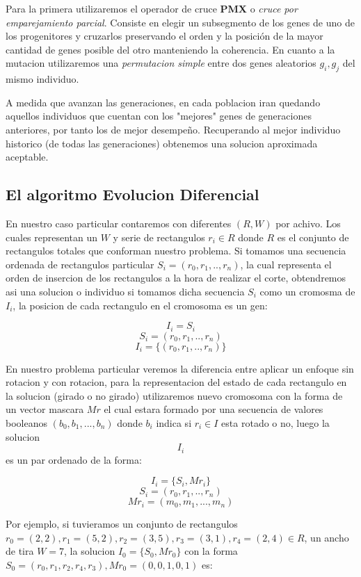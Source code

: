 \documentclass[10pt]{article}
\begin{document}
Para la primera utilizaremos el operador de cruce \textbf{PMX} o \textit{cruce por emparejamiento parcial}. Consiste en elegir un subsegmento de los genes de uno de los progenitores y cruzarlos preservando el orden y la posición de la mayor cantidad de genes posible del otro manteniendo la coherencia.
En cuanto a la mutacion utilizaremos una \textit{permutacion simple} entre dos genes aleatorios $g_i,g_j$ del mismo individuo.

A medida que avanzan las generaciones, en cada poblacion iran quedando aquellos individuos que cuentan con los "mejores"  genes de generaciones anteriores, por tanto los de mejor desempeño. Recuperando al mejor individuo historico (de todas las generaciones) obtenemos una solucion aproximada aceptable.

\subsection{El algoritmo Evolucion Diferencial}

En nuestro caso particular contaremos con diferentes $(R,W)$ por achivo. Los cuales representan un $W$ y serie de rectangulos $r_i \in R$ donde $R$ es el conjunto de rectangulos totales que conforman nuestro problema. Si tomamos una secuencia ordenada de rectangulos particular $S_i = (r_0,r_1,..,r_n)$, la cual representa el orden de insercion de los rectangulos a la hora de realizar el corte, obtendremos asi una solucion o individuo si tomamos dicha secuencia $S_i$ como un cromosma de $I_i$, la posicion de cada rectangulo en el cromosoma es un gen:

$$I_i = S_i$$
$$S_i = (r_0,r_1,..,r_n)$$
$$I_i = \{(r_0,r_1,..,r_n)\}$$

En nuestro problema particular veremos la diferencia entre aplicar un enfoque sin rotacion y con rotacion, para la representacion del estado de cada rectangulo en la solucion (girado o no girado) utilizaremos nuevo cromosoma con la forma de un vector mascara $Mr$ el cual estara formado por una secuencia de valores booleanos $(b_0, b_1,...,b_n)$ donde $b_i$ indica si $r_i \in I$ esta rotado o no, luego la solucion $$I_i$$ es un par ordenado de la forma:

$$I_i = \{S_i,Mr_i\}$$
$$S_i = (r_0,r_1,..,r_n)$$
$$Mr_i = (m_0, m_1,...,m_n)$$


Por ejemplo, si tuvieramos un conjunto de rectangulos $r_0=(2,2),r_1=(5,2),r_2=(3,5), r_3 = (3,1), r_4=(2,4)\in R$, un ancho de tira $W = 7$, la solucion $I_0 = \{S_0,Mr_0\}$ con la forma $S_0 = (r_0,r_1,r_2,r_4,r_3), Mr_0 = (0,0,1,0,1)$ es:
\end{document}
